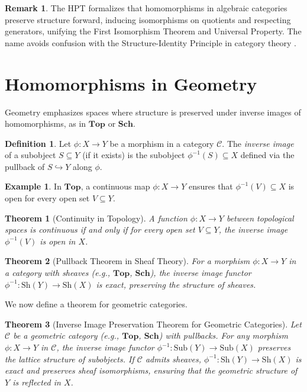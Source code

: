 \documentclass{article}
\theoremstyle{plain}
\newtheorem{theorem}{Theorem}
\theoremstyle{definition}
\newtheorem{definition}{Definition}
\newtheorem{example}{Example}
\newtheorem{remark}{Remark}
\begin{document}
\begin{remark}
The HPT formalizes that homomorphisms in algebraic categories preserve structure forward, inducing isomorphisms on quotients and respecting generators, unifying the First Isomorphism Theorem and Universal Property. The name avoids confusion with the Structure-Identity Principle in category theory \cite{mac}.
\end{remark}

\section{Homomorphisms in Geometry}
Geometry emphasizes spaces where structure is preserved under inverse images of homomorphisms, as in \(\mathbf{Top}\) or \(\mathbf{Sch}\).

\begin{definition}
Let \(\phi: X \to Y\) be a morphism in a category \(\mathcal{C}\). The \emph{inverse image} of a subobject \(S \subseteq Y\) (if it exists) is the subobject \(\phi^{-1}(S) \subseteq X\) defined via the pullback of \(S \hookrightarrow Y\) along \(\phi\).
\end{definition}

\begin{example}
In \(\mathbf{Top}\), a continuous map \(\phi: X \to Y\) ensures that \(\phi^{-1}(V) \subseteq X\) is open for every open set \(V \subseteq Y\).
\end{example}

\begin{theorem}[Continuity in Topology]
A function \(\phi: X \to Y\) between topological spaces is continuous if and only if for every open set \(V \subseteq Y\), the inverse image \(\phi^{-1}(V)\) is open in \(X\).
\end{theorem}

\begin{theorem}[Pullback Theorem in Sheaf Theory]
For a morphism \(\phi: X \to Y\) in a category with sheaves (e.g., \(\mathbf{Top}\), \(\mathbf{Sch}\)), the inverse image functor \(\phi^{-1}: \text{Sh}(Y) \to \text{Sh}(X)\) is exact, preserving the structure of sheaves.
\end{theorem}

We now define a theorem for geometric categories.

\begin{theorem}[Inverse Image Preservation Theorem for Geometric Categories]
Let \(\mathcal{C}\) be a geometric category (e.g., \(\mathbf{Top}\), \(\mathbf{Sch}\)) with pullbacks. For any morphism \(\phi: X \to Y\) in \(\mathcal{C}\), the inverse image functor \(\phi^{-1}: \text{Sub}(Y) \to \text{Sub}(X)\) preserves the lattice structure of subobjects. If \(\mathcal{C}\) admits sheaves, \(\phi^{-1}: \text{Sh}(Y) \to \text{Sh}(X)\) is exact and preserves sheaf isomorphisms, ensuring that the geometric structure of \(Y\) is reflected in \(X\).
\end{theorem}
\end{document}
